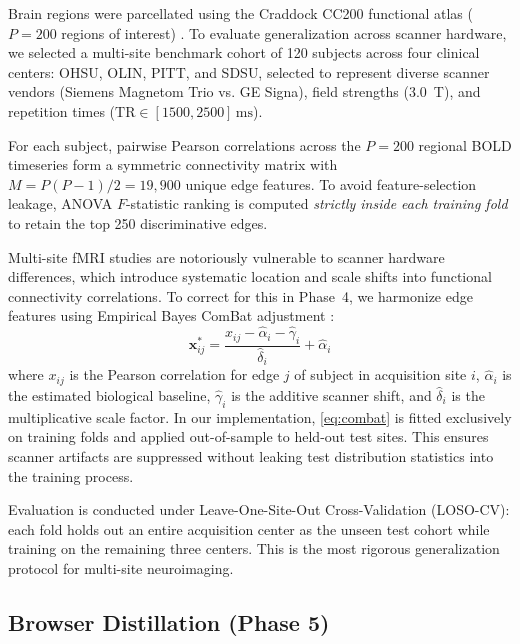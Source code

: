 \documentclass[conference]{IEEEtran}
\begin{document}
Brain regions were parcellated using the Craddock CC200 functional atlas ($P = 200$ regions of interest) \cite{craddock2012}. To evaluate generalization across scanner hardware, we selected a multi-site benchmark cohort of 120 subjects across four clinical centers: OHSU, OLIN, PITT, and SDSU, selected to represent diverse scanner vendors (Siemens Magnetom Trio vs. GE Signa), field strengths (3.0~T), and repetition times ($\text{TR} \in [1500, 2500]\,\text{ms}$).

For each subject, pairwise Pearson correlations across the $P=200$ regional BOLD timeseries form a symmetric connectivity matrix with $M = P(P-1)/2 = 19,900$ unique edge features. To avoid feature-selection leakage, ANOVA $F$-statistic ranking is computed \emph{strictly inside each training fold} to retain the top 250 discriminative edges.

Multi-site fMRI studies are notoriously vulnerable to scanner hardware differences, which introduce systematic location and scale shifts into functional connectivity correlations. To correct for this in Phase~4, we harmonize edge features using Empirical Bayes ComBat adjustment \cite{johnson2007combat}:
\begin{equation}
  \mathbf{x}_{ij}^{*} = \frac{x_{ij} - \hat{\alpha}_i -
  \hat{\gamma}_i}{\hat{\delta}_i} + \hat{\alpha}_i
  \label{eq:combat}
\end{equation}
where $x_{ij}$ is the Pearson correlation for edge $j$ of subject in acquisition site $i$, $\hat{\alpha}_i$ is the estimated biological baseline, $\hat{\gamma}_i$ is the additive scanner shift, and $\hat{\delta}_i$ is the multiplicative scale factor. In our implementation, \eqref{eq:combat} is fitted exclusively on training folds and applied out-of-sample to held-out test sites. This ensures scanner artifacts are suppressed without leaking test distribution statistics into the training process.

Evaluation is conducted under Leave-One-Site-Out Cross-Validation (LOSO-CV): each fold holds out an entire acquisition center as the unseen test cohort while training on the remaining three centers. This is the most rigorous generalization protocol for multi-site neuroimaging.

\subsection{Browser Distillation (Phase 5)}
\end{document}
